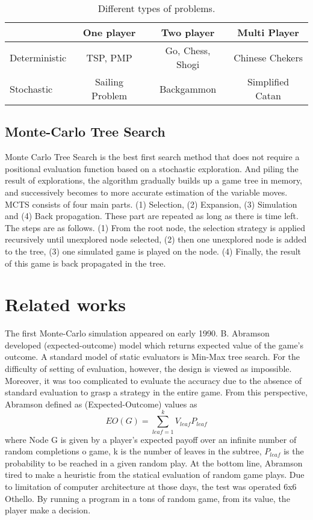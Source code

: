 \documentclass[12pt]{article}
\begin{document}
\begin{table}
\centering
\caption{Different types of problems.}
\begin{tabular}{| l || c | c | c |}
\hline
 & One player & Two player & Multi Player \\
   \hline 
Deterministic & TSP, PMP & Go, Chess, Shogi & Chinese Chekers\\
\hline
Stochastic & Sailing Problem & Backgammon & Simplified Catan\\

\hline
   \end{tabular}

\end{table}

\subsection{Monte-Carlo Tree Search}
Monte Carlo Tree Search is the best first search method that does not require a positional evaluation function based on a stochastic exploration. And piling the result of explorations, the algorithm gradually builds up a game tree in memory, and successively becomes to more accurate estimation of the variable moves.  MCTS consists of four main parts. (1) Selection, (2) Expansion, (3) Simulation and (4) Back propagation. These part are repeated as long as there is time left. The steps are as follows. (1) From the root node,  the selection strategy is applied recursively until unexplored node selected, (2) then one unexplored node is added to the tree, (3) one simulated game is played on the node. (4) Finally, the result of this game is back propagated in the tree. 



\section{Related works}
The first Monte-Carlo simulation appeared on early 1990. B. Abramson developed (expected-outcome) model which returns expected value of the game’s outcome\cite{abramson1990expected}. A standard model of static evaluators is Min-Max tree search. For the difficulty of setting of evaluation, however, the design is viewed as impossible. Moreover, it was too complicated to evaluate the accuracy due to the absence of standard evaluation to grasp a strategy in the entire game. From this perspective, Abramson defined as (Expected-Outcome) values as 
\[EO(G) = \sum_{leaf=1}^{k} V_{leaf} P_{leaf}\]
where Node G is given by a player’s expected payoff over an infinite number of random completions o game, k is the number of leaves in the subtree, \(P_{leaf}\) is the probability to be reached in a given random play. At the bottom line, Abramson tired to make a heuristic from the statical evaluation of random game plays. Due to limitation of computer architecture at those days, the test was operated 6x6 Othello. By running a program in a tons of random game, from its value, the player make a decision. 
\end{document}
